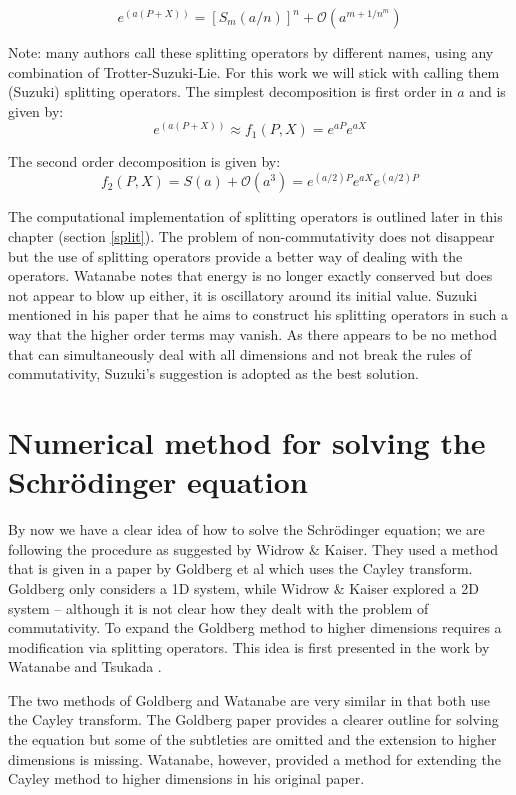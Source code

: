 \begin{equation}
 e^{(a(P + X))} = [S_m(a/n)]^n + \mathcal{O}(a^{m+1/n^m})
\end{equation}

\noindent Note: many authors call these splitting operators by different names, using any combination of Trotter-Suzuki-Lie. For this work we will stick with calling them (Suzuki) splitting operators. The simplest decomposition is first order in $a$ and is given by:
\begin{equation}
 e^{(a(P + X))} \approx f_1(P,X) = e^{aP}e^{aX}
\end{equation}

\noindent The second order decomposition is given by:
\begin{equation}
 f_2(P,X) = S(a) + \mathcal{O}(a^3) = e^{(a/2)P}e^{aX}e^{(a/2)P}
\end{equation}

\noindent The computational implementation of splitting operators is outlined later in this chapter (section \ref{split}). The problem of non-commutativity does not disappear but the use of splitting operators provide a better way of dealing with the operators. Watanabe notes that energy is no longer exactly conserved but does not appear to blow up either, it is oscillatory around its initial value. Suzuki mentioned in his paper that he aims to construct his splitting operators in such a way that the higher order terms may vanish. As there appears to be no method that can simultaneously deal with all dimensions and not break the rules of commutativity, Suzuki's suggestion is adopted as the best solution.

\section{Numerical method for solving the Schr\"odinger equation}
By now we have a clear idea of how to solve the Schr\"odinger equation; we are following the procedure as suggested by Widrow \& Kaiser. They  used a method that is given in a paper by Goldberg et al \citep{bib_gold} which uses the Cayley transform. Goldberg only considers a 1D system, while Widrow \& Kaiser explored a 2D system -- although it is not clear how they dealt with the problem of commutativity. To expand the Goldberg method to higher dimensions requires a modification via splitting operators. This idea is first presented in the work by Watanabe and Tsukada \citep{bib_wat}.

The two methods of Goldberg and Watanabe are very similar in that both use the Cayley transform. The Goldberg paper provides a clearer outline for solving the equation but some of the subtleties are omitted and the extension to higher dimensions is missing. Watanabe, however, provided a method for extending the Cayley method to higher dimensions in his original paper. \citep{bib_wat}

